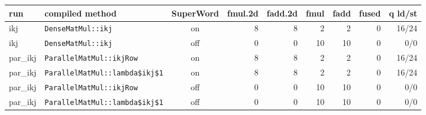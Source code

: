 \begin{tabular}{llcrrrrrr}
\toprule
run & compiled method & SuperWord & fmul.2d & fadd.2d & fmul & fadd & fused & q ld/st \\
\midrule
ikj & \texttt{DenseMatMul::ikj} & on & 8 & 8 & 2 & 2 & 0 & 16/24 \\
ikj & \texttt{DenseMatMul::ikj} & off & 0 & 0 & 10 & 10 & 0 & 0/0 \\
par\_ikj & \texttt{ParallelMatMul::ikjRow} & on & 8 & 8 & 2 & 2 & 0 & 16/24 \\
par\_ikj & \texttt{ParallelMatMul::lambda\$ikj\$1} & on & 8 & 8 & 2 & 2 & 0 & 16/24 \\
par\_ikj & \texttt{ParallelMatMul::ikjRow} & off & 0 & 0 & 10 & 10 & 0 & 0/0 \\
par\_ikj & \texttt{ParallelMatMul::lambda\$ikj\$1} & off & 0 & 0 & 10 & 10 & 0 & 0/0 \\
\bottomrule
\end{tabular}
